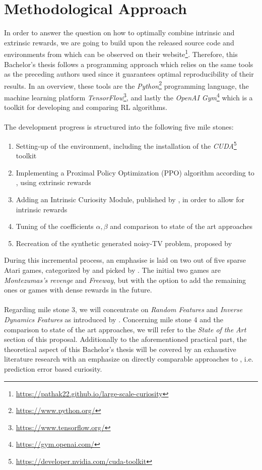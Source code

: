\documentclass[draft,final]{vutinfth} %
\begin{document}
    \section{Methodological Approach}
    In order to answer the question on how to optimally combine intrinsic and extrinsic rewards, we are going to build upon the released source code and environments from \cite{burda_large-scale_2018} which can be observed on their website\footnote{\url{https://pathak22.github.io/large-scale-curiosity}}.
    Therefore, this Bachelor's thesis follows a programming approach which relies on the same tools as the preceding authors used since it guarantees optimal reproducibility of their results.
    In an overview, these tools are the \textit{Python}\footnote{\url{https://www.python.org/}} programming language, the machine learning platform \textit{TensorFlow}\footnote{\url{https://www.tensorflow.org/}}, and lastly the \textit{OpenAI Gym}\footnote{\url{https://gym.openai.com/}} which is a toolkit for developing and comparing RL algorithms.
    \\\\
    The development progress is structured into the following five mile stones:

    \begin{enumerate}
        \item Setting-up of the environment, including the installation of the \textit{CUDA}\footnote{\url{https://developer.nvidia.com/cuda-toolkit}} toolkit
        \item Implementing a Proximal Policy Optimization (PPO) algorithm according to \cite{schulman_proximal_2017}, using extrinsic rewards
        \item Adding an Intrinsic Curiosity Module, published by \cite{pathak_curiosity-driven_2017}, in order to allow for intrinsic rewards
        \item Tuning of the coefficients $\alpha,\beta$ and comparison to state of the art approaches
        \item Recreation of the synthetic generated noisy-TV problem, proposed by \cite{burda_large-scale_2018}
    \end{enumerate}

    During this incremental process, an emphasise is laid on two out of five sparse Atari games, categorized by \cite{bellemare_unifying_2016} and picked by \cite{burda_large-scale_2018}.
    The initial two games are \textit{Montezumas's revenge} and \textit{Freeway}, but with the option to add the remaining ones or games with dense rewards in the future.
    \\\\
    Regarding mile stone 3, we will concentrate on \textit{Random Features} and \textit{Inverse Dynamics Features} as introduced by \cite{burda_large-scale_2018}.
    Concerning mile stone 4 and the comparison to state of the art approaches, we will refer to the \textit{State of the Art} section of this proposal.
    Additionally to the aforementioned practical part, the theoretical aspect of this Bachelor's thesis will be covered by an exhaustive literature research with an emphasize on directly comparable approaches to \cite{burda_large-scale_2018}, i.e. prediction error based curiosity.
\end{document}

